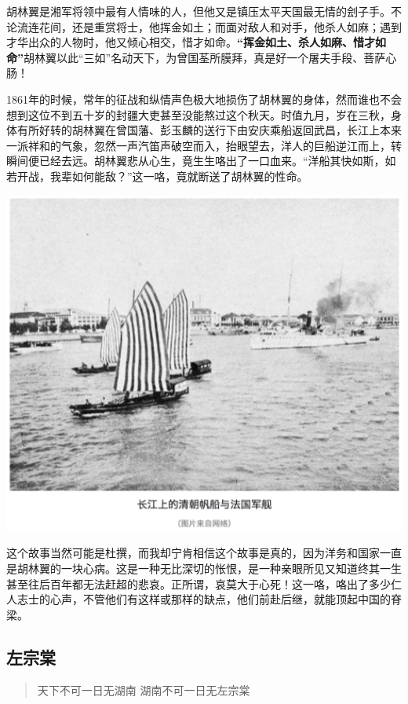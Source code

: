 \documentclass[]{book}
\begin{document}
胡林翼是湘军将领中最有人情味的人，但他又是镇压太平天国最无情的刽子手。不论流连花间，还是重赏将士，他挥金如土；而面对敌人和对手，他杀人如麻；遇到才华出众的人物时，他又倾心相交，惜才如命。\textbf{``挥金如土、杀人如麻、惜才如命''}胡林翼以此``三如''名动天下，为曾国荃所膜拜，真是好一个屠夫手段、菩萨心肠！

1861年的时候，常年的征战和纵情声色极大地损伤了胡林翼的身体，然而谁也不会想到这位不到五十岁的封疆大吏甚至没能熬过这个秋天。时值九月，岁在三秋，身体有所好转的胡林翼在曾国藩、彭玉麟的送行下由安庆乘船返回武昌，长江上本来一派祥和的气象，忽然一声汽笛声破空而入，抬眼望去，洋人的巨船逆江而上，转瞬间便已经去远。胡林翼悲从心生，竟生生咯出了一口血来。``洋船其快如斯，如若开战，我辈如何能敌？''这一咯，竟就断送了胡林翼的性命。

\includegraphics[width=6.67in]{images/his1}

这个故事当然可能是杜撰，而我却宁肯相信这个故事是真的，因为洋务和国家一直是胡林翼的一块心病。这是一种无比深切的怅恨，是一种亲眼所见又知道终其一生甚至往后百年都无法赶超的悲哀。正所谓，哀莫大于心死！这一咯，咯出了多少仁人志士的心声，不管他们有这样或那样的缺点，他们前赴后继，就能顶起中国的脊梁。

\subsection{左宗棠}

\begin{quote}
天下不可一日无湖南 湖南不可一日无左宗棠
\end{quote}
\end{document}

